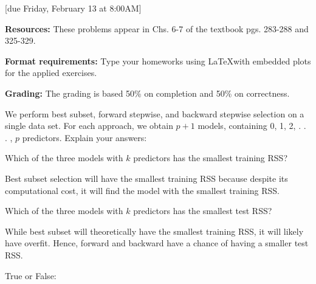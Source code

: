 \documentclass{article}
\begin{document}
[due Friday, February 13 at 8:00AM]

\textbf{Resources:} These problems appear in Chs. 6-7 of the textbook pgs. 283-288 and 325-329.

\textbf{Format requirements:} Type your homeworks using \LaTeX with embedded plots for the applied exercises.

\textbf{Grading:} The grading is based 50\% on completion and 50\% on correctness.
\vspace{1em}

\begin{probset}

\begin{prob}
    We perform best subset, forward stepwise, and backward stepwise selection on a single data set. For each approach, we obtain $p + 1$ models, containing 0, 1, 2, . . . , $p$ predictors. Explain your answers:

    \begin{subprobset}
        \begin{subprob}
            Which of the three models with $k$ predictors has the smallest training RSS?

            \begin{soln}
                Best subset selection will have the smallest training RSS because despite its computational cost, it will find the model with the smallest training RSS.
            \end{soln}
        \end{subprob}

        \begin{subprob}
            Which of the three models with $k$ predictors has the smallest test RSS?

            \begin{soln}
                While best subset will theoretically have the smallest training RSS, it will likely have overfit. Hence, forward and backward have a chance of having a smaller test RSS.
            \end{soln}
        \end{subprob}

        \begin{subprob}
            True or False:


\end{subprob}
\end{subprobset}
\end{prob}
\end{probset}
\end{document}
